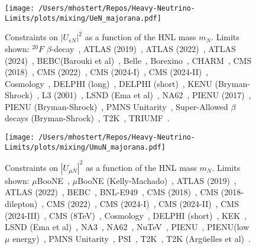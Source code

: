 \documentclass{revtex4-1}%
\begin{document}
%
\normalsize%


\begin{figure}[h!]%
\centering%
\texttt{[image: /Users/mhostert/Repos/Heavy-Neutrino-Limits/plots/mixing/UeN\_majorana.pdf]}%
\caption{Constraints on $|U_{e N}|^2$ as a function of the HNL mass $m_N$. Limits shown: $^{20}F$ $\beta$-decay~\cite{Deutsch:1990ut}, ATLAS (2019)~\cite{ATLAS:2019kpx}, ATLAS (2022)~\cite{ATLAS:2022atq}, ATLAS (2024)~\cite{2403.15085}, BEBC(Barouki et al)~\cite{Barouki:2022bkt}, Belle~\cite{Belle:2013ytx}, Borexino~\cite{Borexino:2013bot}, CHARM~\cite{CHARM:1985nku}, CMS (2018)~\cite{CMS:2018iaf}, CMS (2022)~\cite{CMS:2022fut}, CMS (2024-I)~\cite{CMS:2024ake}, CMS (2024-II)~\cite{CMS:2024xdq}, Cosmology~\cite{Sabti:2020yrt}, DELPHI (long)~\cite{DELPHI:1996qcc}, DELPHI (short)~\cite{DELPHI:1996qcc}, KENU (Bryman-Shrock)~\cite{Bryman:2019bjg}, L3 (2001)~\cite{L3:2001zfe}, LSND (Ema et al)~\cite{Ema:2023buz}, NA62~\cite{NA62:2020mcv}, PIENU (2017)~\cite{PIENU:2017wbj}, PIENU (Bryman-Shrock)~\cite{Bryman:2019bjg}, PMNS Unitarity~\cite{Blennow:2023mqx}, Super-Allowed $\beta$ decays (Bryman-Shrock)~\cite{Bryman:2019bjg}, T2K~\cite{T2K:2019jwa}, TRIUMF~\cite{Britton:1992xv}.}%
\end{figure}

%


\begin{figure}[h!]%
\centering%
\texttt{[image: /Users/mhostert/Repos/Heavy-Neutrino-Limits/plots/mixing/UmuN\_majorana.pdf]}%
\caption{Constraints on $|U_{\mu N}|^2$ as a function of the HNL mass $m_N$. Limits shown: $\mu$BooNE~\cite{MicroBooNE:2023icy}, $\mu$BooNE (Kelly-Machado)~\cite{Kelly:2021xbv}, ATLAS (2019)~\cite{ATLAS:2019kpx}, ATLAS (2022)~\cite{ATLAS:2022atq}, BEBC~\cite{WA66:1985mfx}, BNL-E949~\cite{E949:2014gsn}, CMS (2018)~\cite{CMS:2018iaf}, CMS (2018-dilepton)~\cite{CMS:2018jxx}, CMS (2022)~\cite{CMS:2022fut}, CMS (2024-I)~\cite{CMS:2024ake}, CMS (2024-II)~\cite{CMS:2024xdq}, CMS (2024-III)~\cite{CMS:2024ita}, CMS (8TeV)~\cite{CMS:2016aro}, Cosmology~\cite{Sabti:2020yrt}, DELPHI (short)~\cite{DELPHI:1996qcc}, KEK~\cite{Bryman:2019bjg}, LSND (Ema et al)~\cite{Ema:2023buz}, NA3~\cite{NA3:1986ahv}, NA62~\cite{NA62:2021bji}, NuTeV~\cite{NuTeV:1999kej}, PIENU~\cite{PIENU:2019usb}, PIENU(low $\mu$ energy)~\cite{PIENU:2019usb}, PMNS Unitarity~\cite{Blennow:2023mqx}, PSI~\cite{Daum:1987bg}, T2K~\cite{T2K:2019jwa}, T2K (Arg\"uelles et al)~\cite{Arguelles:2021dqn}.}%
\end{figure}
\end{document}
